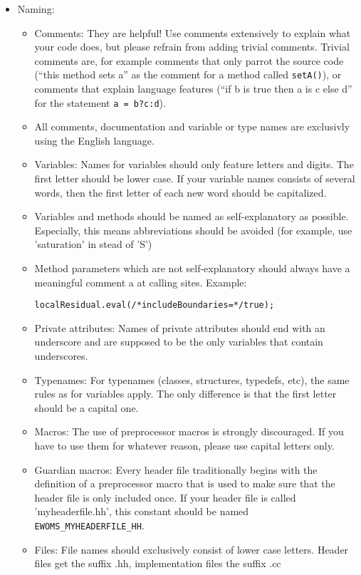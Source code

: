 \begin{itemize}
\item Naming:
\begin{itemize}
\item Comments: They are helpful! Use comments extensively to explain
  what your code does, but please refrain from adding trivial
  comments. Trivial comments are, for example comments that only
  parrot the source code (``this method sets a'' as the comment for a
  method called \texttt{setA()}), or comments that explain language
  features (``if b is true then a is c else d'' for the statement
  \texttt{a = b?c:d}).
\item All comments, documentation and variable or type names are
  exclusivly using the English language.
\item Variables: Names for variables should only feature letters and
  digits. The first letter should be lower case. If your variable
  names consists of several words, then the first letter of each new
  word should be capitalized.
\item Variables and methods should be named as self-explanatory as
  possible. Especially, this means abbreviations should be avoided
  (for example, use 'saturation' in stead of 'S')
\item Method parameters which are not self-explanatory should always
  have a meaningful comment a at calling sites. Example:
\begin{lstlisting}[style=eWomsCode]
   localResidual.eval(/*includeBoundaries=*/true);
\end{lstlisting}
\item Private attributes: Names of private attributes should end with
  an underscore and are supposed to be the only variables that contain
  underscores.
\item Typenames: For typenames (classes, structures, typedefs, etc),
  the same rules as for variables apply. The only difference is that
  the first letter should be a capital one.
\item Macros: The use of preprocessor macros is strongly
  discouraged. If you have to use them for whatever reason, please use
  capital letters only.
\item Guardian macros: Every header file traditionally begins with the
  definition of a preprocessor macro that is used to make sure that
  the header file is only included once. If your header file is
  called 'myheaderfile.hh', this constant should be named
  \texttt{EWOMS\_MYHEADERFILE\_HH}.
\item Files: File names should exclusively consist of lower case
  letters. Header files get the suffix .hh, implementation files the
  suffix .cc
\end{itemize}


\end{itemize}
